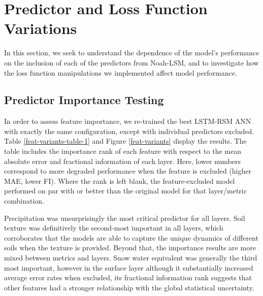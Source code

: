 \newpage

\section{Predictor and Loss Function Variations}

\noindent
In this section, we seek to understand the dependence of the model's performance on the inclusion of each of the predictors from Noah-LSM, and to investigate how the loss function manipulations we implemented affect model performance.

\subsection{Predictor Importance Testing}

In order to assess feature importance, we re-trained the best LSTM-RSM ANN with exactly the same configuration, except with individual predictors excluded. Table \ref{feat-variants-table-1} and Figure \ref{feat-variants} display the results. The table includes the importance rank of each feature with respect to the mean absolute error and fractional information of each layer. Here, lower numbers correspond to more degraded performance when the feature is excluded (higher MAE, lower FI). Where the rank is left blank, the feature-excluded model performed on par with or better than the original model for that layer/metric combination.

Precipitation was unsurprisingly the most critical predictor for all layers. Soil texture was definitively the second-most important in all layers, which corroborates that the models are able to capture the unique dynamics of different soils when the texture is provided. Beyond that, the importance results are more mixed between metrics and layers. Snow water equivalent was generally the third most important, however in the surface layer although it substantially increased average error rates when excluded, its fractional information rank suggests that other features had a stronger relationship with the global statistical uncertainty.


